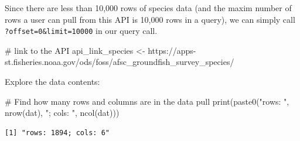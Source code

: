 \documentclass[
  letterpaper,
  oneside,
  open=any]{scrbook}
\newenvironment{Shaded}{\begin{snugshade}}{\end{snugshade}}
\newcommand{\AttributeTok}[1]{\textcolor[rgb]{0.40,0.45,0.13}{#1}}
\newcommand{\CommentTok}[1]{\textcolor[rgb]{0.37,0.37,0.37}{#1}}
\newcommand{\DocumentationTok}[1]{\textcolor[rgb]{0.37,0.37,0.37}{\textit{#1}}}
\newcommand{\FunctionTok}[1]{\textcolor[rgb]{0.28,0.35,0.67}{#1}}
\newcommand{\NormalTok}[1]{\textcolor[rgb]{0.00,0.23,0.31}{#1}}
\newcommand{\OtherTok}[1]{\textcolor[rgb]{0.00,0.23,0.31}{#1}}
\newcommand{\SpecialCharTok}[1]{\textcolor[rgb]{0.37,0.37,0.37}{#1}}
\newcommand{\StringTok}[1]{\textcolor[rgb]{0.13,0.47,0.30}{#1}}
\begin{document}
Since there are less than 10,000 rows of species data (and the maxim
number of rows a user can pull from this API is 10,000 rows in a query),
we can simply call \texttt{?offset=0\&limit=10000} in our query call.

\begin{Shaded}
\begin{Highlighting}[]
\CommentTok{\# link to the API}
\NormalTok{api\_link\_species }\OtherTok{\textless{}{-}} \StringTok{\textquotesingle{}https://apps{-}st.fisheries.noaa.gov/ods/foss/afsc\_groundfish\_survey\_species/\textquotesingle{}}
\end{Highlighting}
\end{Shaded}

\begin{Shaded}
\end{Shaded}

Explore the data contents:

\begin{Shaded}
\begin{Highlighting}[]
\CommentTok{\# Find how many rows and columns are in the data pull}
\FunctionTok{print}\NormalTok{(}\FunctionTok{paste0}\NormalTok{(}\StringTok{"rows: "}\NormalTok{, }\FunctionTok{nrow}\NormalTok{(dat), }\StringTok{"; cols: "}\NormalTok{, }\FunctionTok{ncol}\NormalTok{(dat)))}
\end{Highlighting}
\end{Shaded}

\begin{verbatim}
[1] "rows: 1894; cols: 6"
\end{verbatim}
\end{document}
